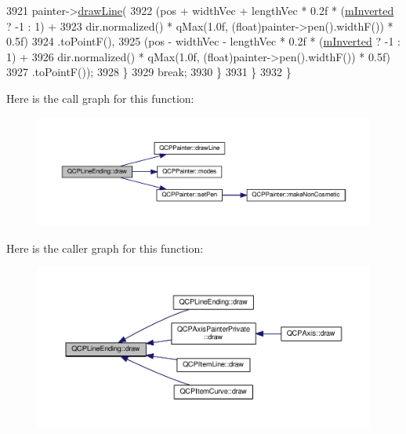 \begin{DoxyCode}
3921       painter->\hyperlink{class_q_c_p_painter_a0b4b1b9bd495e182c731774dc800e6e0}{drawLine}(
3922           (pos + widthVec + lengthVec * 0.2f * (\hyperlink{class_q_c_p_line_ending_a91306fe771d54c955e0af21af14349d5}{mInverted} ? -1 : 1) +
3923            dir.normalized() * qMax(1.0f, (\textcolor{keywordtype}{float})painter->pen().widthF()) * 0.5f)
3924               .toPointF(),
3925           (pos - widthVec - lengthVec * 0.2f * (\hyperlink{class_q_c_p_line_ending_a91306fe771d54c955e0af21af14349d5}{mInverted} ? -1 : 1) +
3926            dir.normalized() * qMax(1.0f, (\textcolor{keywordtype}{float})painter->pen().widthF()) * 0.5f)
3927               .toPointF());
3928     \}
3929     \textcolor{keywordflow}{break};
3930   \}
3931   \}
3932 \}
\end{DoxyCode}


Here is the call graph for this function\+:\nopagebreak
\begin{figure}[H]
\begin{center}
\leavevmode
\includegraphics[width=350pt]{class_q_c_p_line_ending_ac4b2fa94bd27b2f008b5fc090fcd7c0b_cgraph}
\end{center}
\end{figure}




Here is the caller graph for this function\+:\nopagebreak
\begin{figure}[H]
\begin{center}
\leavevmode
\includegraphics[width=350pt]{class_q_c_p_line_ending_ac4b2fa94bd27b2f008b5fc090fcd7c0b_icgraph}
\end{center}
\end{figure}


